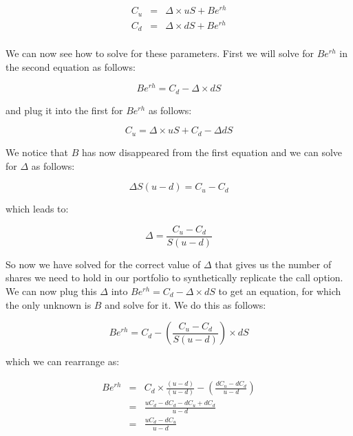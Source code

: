 \documentclass[11pt]{article}
\begin{document}
\medskip
\begin{eqnarray*}
 C_{u} &=& \Delta \times u S + B e^{rh} \\
 C_{d} &=& \Delta \times d S + B e^{rh} \\
\end{eqnarray*}

\medskip
We can now see how to solve for these parameters. First we will solve for $B e^{rh}$ in the second equation
as follows:

\medskip
\begin{equation*}
B e^{rh} = C_{d} - \Delta \times d S
\end{equation*}

\medskip
and plug it into the first for $B e^{rh}$ as follows:

\medskip
\begin{equation*}
C_{u} = \Delta \times u S + C_{d} - \Delta d S
\end{equation*}

\medskip
We notice that $B$ has now disappeared from the first equation and we can solve for $\Delta$ as follows:

\begin{equation*}
\Delta S (u - d) = C_{u} - C_{d}
\end{equation*}

\medskip
which leads to:

\medskip
\begin{equation*}
\Delta = \frac{C_{u} - C_{d}}{S(u-d)}
\end{equation*}

\medskip
So now we have solved for the correct value of $\Delta$ that gives us the number of shares we need to hold
in our portfolio to synthetically replicate the call option.  We can now plug this $\Delta$ into
$B e^{rh} = C_{d} - \Delta \times dS$ to get an equation, for which the only unknown is $B$ and solve for it.
We do this as follows:

\medskip
\begin{equation*}
B e^{rh} = C_{d} - \left(\frac{C_{u} - C_{d}}{S(u-d)}\right) \times d S
\end{equation*}

\medskip
which we can rearrange as:

\medskip
\begin{eqnarray*}
B e^{rh} &=& C_{d} \times \frac{(u-d)}{(u-d)} - \left(\frac{d C_{u} - d C_{d}}{u-d}\right) \\
         &=& \frac{u C_{d} - d C_{d} - d C_{u} + d C_{d}}{u-d} \\
         &=& \frac{u C_{d} - d C_{u}}{u-d}
\end{eqnarray*}
\end{document}
